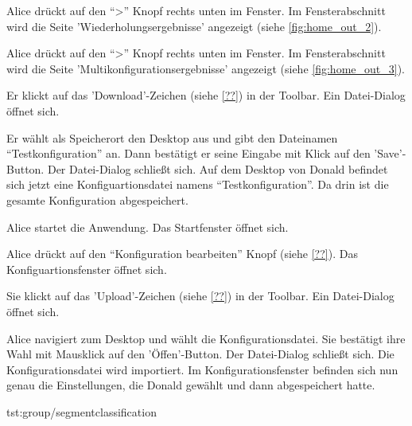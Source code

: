 \documentclass[parskip=full,11pt]{scrartcl}
\begin{document}
{Alice drückt auf den \enquote{>} Knopf rechts unten im Fenster.}
{Im Fensterabschnitt wird die Seite 'Wiederholungsergebnisse' angezeigt (siehe \cref{fig:home_out_2}).}

{Alice drückt auf den \enquote{>} Knopf rechts unten im Fenster.}
{Im Fensterabschnitt wird die Seite 'Multikonfigurationsergebnisse' angezeigt (siehe \cref{fig:home_out_3}).}


{Er klickt auf das 'Download'-Zeichen (siehe \cref{??}) in der Toolbar.}
{Ein Datei-Dialog öffnet sich.}

{Er wählt als Speicherort den Desktop aus und gibt den Dateinamen \enquote{Testkonfiguration} an. Dann bestätigt er seine Eingabe mit Klick auf den 'Save'-Button.}
{Der Datei-Dialog schließt sich. Auf dem Desktop von Donald befindet sich jetzt eine Konfiguartionsdatei namens \enquote{Testkonfiguration}. Da drin ist die gesamte Konfiguration abgespeichert.}

{Alice startet die Anwendung.}
{Das Startfenster öffnet sich.}

{Alice drückt auf den \enquote{Konfiguration bearbeiten} Knopf (siehe \cref{??}).}
{Das Konfiguartionsfenster öffnet sich.}

{Sie klickt auf das 'Upload'-Zeichen (siehe \cref{??}) in der Toolbar.}
{Ein Datei-Dialog öffnet sich.}

{Alice navigiert zum Desktop und wählt die Konfigurationsdatei. Sie bestätigt ihre Wahl mit Mausklick auf den 'Öffen'-Button.}
{Der Datei-Dialog schließt sich. Die Konfigurationsdatei wird importiert. Im Konfigurationsfenster befinden sich nun genau die Einstellungen, die Donald gewählt und dann abgespeichert hatte.}

{tst:group/segmentclassification}
\end{document}
